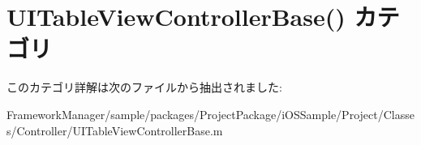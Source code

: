 \hypertarget{category_u_i_table_view_controller_base_07_08}{}\section{U\+I\+Table\+View\+Controller\+Base() カテゴリ}
\label{category_u_i_table_view_controller_base_07_08}


このカテゴリ詳解は次のファイルから抽出されました\+:\begin{DoxyCompactItemize}
\item 
Framework\+Manager/sample/packages/\+Project\+Package/i\+O\+S\+Sample/\+Project/\+Classes/\+Controller/U\+I\+Table\+View\+Controller\+Base.\+m\end{DoxyCompactItemize}
